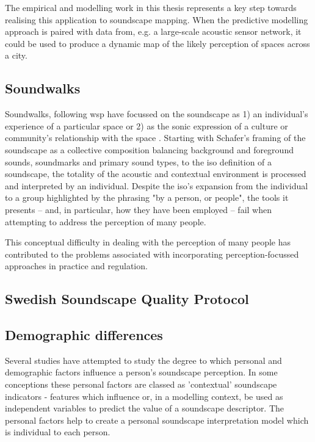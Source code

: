 The empirical and modelling work in this thesis represents a key step towards realising this application to soundscape mapping. When the predictive modelling approach is paired with data from, e.g. a large-scale acoustic sensor network, it could be used to produce a dynamic map of the likely perception of spaces across a city. 




\subsection{Soundwalks}
Soundwalks, following \gls{wsp} have focussed on the soundscape as 1) an individual's experience of a particular space or 2) as the sonic expression of a culture or community's relationship with the space \citep{Droumeva2021sound}. Starting with Schafer's framing of the soundscape as a collective composition balancing background and foreground sounds, soundmarks and primary sound types, to the \gls{iso} definition of a soundscape, the totality of the acoustic and contextual environment is processed and interpreted by an individual. Despite the \gls{iso}'s expansion from the individual to a group highlighted by the phrasing "by a person, or people", the tools it presents -- and, in particular, how they have been employed -- fail when attempting to address the perception of many people.

This conceptual difficulty in dealing with the perception of many people has contributed to the problems associated with incorporating perception-focussed approaches in practice and regulation.  %

\subsection{Swedish Soundscape Quality Protocol}


\subsection{Demographic differences}
Several studies have attempted to study the degree to which personal and demographic factors influence a person's soundscape perception. In some conceptions  %
these personal factors are classed as 'contextual' soundscape indicators - features which influence or, in a modelling context, be used as independent variables to predict the value of a soundscape descriptor. The personal factors help to create a personal soundscape interpretation model which is individual to each person.

